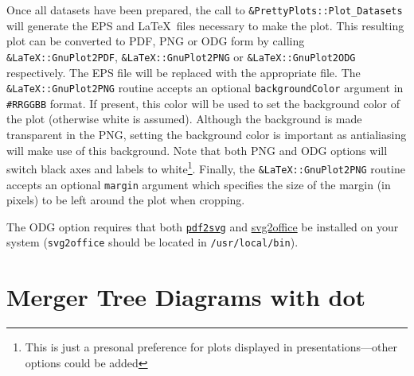 Once all datasets have been prepared, the call to {\tt \&PrettyPlots::Plot\_Datasets} will generate the EPS and \LaTeX\ files necessary to make the plot. This resulting plot can be converted to PDF, PNG or ODG form by calling {\tt \&LaTeX::GnuPlot2PDF}, {\tt \&LaTeX::GnuPlot2PNG} or {\tt \&LaTeX::GnuPlot2ODG} respectively. The EPS file will be replaced with the appropriate file. The {\tt \&LaTeX::GnuPlot2PNG} routine accepts an optional {\tt backgroundColor} argument in {\tt \#RRGGBB} format. If present, this color will be used to set the background color of the plot (otherwise white is assumed). Although the background is made transparent in the PNG, setting the background color is important as antialiasing will make use of this background. Note that both PNG and ODG options will switch black axes and labels to white\footnote{This is just a presonal preference for plots displayed in presentations---other options could be added}. Finally, the {\tt \&LaTeX::GnuPlot2PNG} routine accepts an optional {\tt margin} argument which specifies the size of the margin (in pixels) to be left around the plot when cropping.

The ODG option requires that both \href{http://www.cityinthesky.co.uk/opensource/pdf2svg}{{\tt pdf2svg}} and \href{http://www.haumacher.de/svg-import/}{{svg2office}} be installed on your system ({\tt svg2office} should be located in {\tt /usr/local/bin}).

\section{Merger Tree Diagrams with {\sc dot}}

